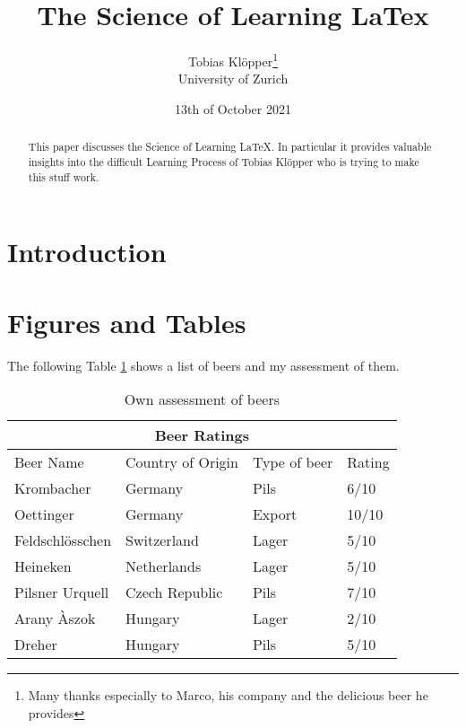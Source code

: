 \documentclass{article}
\begin{document}
\title{The Science of Learning LaTex}
\author{Tobias Klöpper\thanks{Many thanks especially to Marco, his company and the delicious beer he provides} \\
\normalsize University of Zurich}
\date{13th of October 2021}
\maketitle
\begin{abstract}
This paper discusses the Science of Learning LaTeX. In particular it provides valuable insights into the difficult Learning Process of Tobias Klöpper who is trying to make this stuff work.
\end{abstract}
\section{Introduction}
\Blindtext
\newpage
\section{Figures and Tables}
The following Table \ref{table:1} shows a list of beers and my assessment of them.
\begin{table}[h!]
\begin{tabular}{ |p{3cm}||p{3cm}|p{3cm}|p{3cm}|  }
 \hline
 \multicolumn{4}{|c|}{Beer Ratings} \\
 \hline
 Beer Name & Country of Origin &Type of beer&Rating\\
 \hline
 Krombacher   & Germany    & Pils &   6/10\\
 Oettinger&   Germany  & Export   &10/10\\
 Feldschlösschen &Switzerland & Lager &  5/10\\
 Heineken    &Netherlands & Lager &  5/10\\
 Pilsner Urquell&   Czech Republic  & Pils & 7/10\\
 Arany Àszok& Hungary  & Lager   & 2/10\\
 Dreher& Hungary  & Pils & 5/10\\
 \hline
 \end{tabular}
 \caption{Own assessment of beers}
 \label{table:1}
\end{table}
\end{document}

